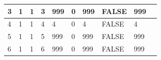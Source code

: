 \begin{table}[h!]
\begin{tabular}{|l|l|l|l|l|l|l|l|l|l|}
		3                                                           & 1                                                       & 1                                                       & 3                                                       & 999                                                                      & 0                                                                        & 999                                                                      & FALSE                                                           & 999                                                                      &                                                               \\ \hline
		4                                                           & 1                                                       & 1                                                       & 4                                                       & 4                                                                        & 0                                                                        & 4                                                                        & FALSE                                                           & 4                                                                        &                                                               \\ \hline
		5                                                           & 1                                                       & 1                                                       & 5                                                       & 999                                                                      & 0                                                                        & 999                                                                      & FALSE                                                           & 999                                                                      &                                                               \\ \hline
		6                                                           & 1                                                       & 1                                                       & 6                                                       & 999                                                                      & 0                                                                        & 999                                                                      & FALSE                                                           & 999                                                                      &                                                               \\ \hline

\end{tabular}
\end{table}
